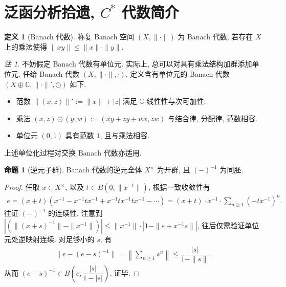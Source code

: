 \documentclass{MainStyle}
\theoremstyle{definition}
\theoremstyle{definition}
\theoremstyle{definition}
\newtheorem{definition}{定义}
\theoremstyle{definition}
\newtheorem{proposition}{命题}
\theoremstyle{definition}
\theoremstyle{definition}
\theoremstyle{definition}
\theoremstyle{remark}
\newtheorem{remark}{注}
\theoremstyle{remark}
\begin{document}
\maketitle
\section{泛函分析拾遗, \texorpdfstring{$C^\ast$}{} 代数简介}

\begin{definition}[Banach 代数]
    称复 Banach 空间 $(X,\|\cdot\|)$ 为 Banach 代数, 若存在 $X$ 上的乘法使得 $\|xy\|\leq \|x\|\cdot \|y\|$.
\end{definition}

\begin{remark}
    不妨假定 Banach 代数有单位元. 实际上, 总可以对具有乘法结构加群添加单位元. 任给 Banach 代数 $(X,\|\cdot\|,\cdot)$, 定义含有单位元的 Banach 代数 $(X\oplus \mathbb C, \| \cdot \|',\odot)$ 如下.
    \begin{itemize}
        \item 范数 $\|(x,z)\|':=\|x\|+|z|$ 满足 $\mathbb C$-线性性与次可加性.
        \item 乘法 $(x,z)\odot(y,w):=(xy+zy+wx,zw)$ 与结合律, 分配律, 范数相容.
        \item 单位元 $(0,1)$ 具有范数 $1$, 且与乘法相容.
    \end{itemize}
    上述单位化过程对交换 Banach 代数亦适用.
\end{remark}

\begin{proposition}[逆元子群]
    Banach 代数的逆元全体 $X^\times$ 为开群, 且 $(-)^{-1}$ 为同胚.
    \begin{proof}
        任取 $x\in X^\times$, 以及 $t\in B(0,\|x^{-1}\|)$, 根据一致收敛性有
        \begin{align*}
            e=(x+t)(x^{-1}-x^{-1}tx^{-1}+x^{-1}tx^{-1}tx^{-1}-\cdots)=(x+t)\cdot x^{-1}\cdot \sum_{n\geq 1}(-tx^{-1})^n.
        \end{align*}
        往证 $(-)^{-1}$ 的连续性. 注意到 $\left|(\|(x+s)^{-1}\|-\|x^{-1}\|)\right|\leq\|x^{-1}\|\cdot |1-\|e+x^{-1}s\||$, 往后仅需验证单位元处逆映射连续. 对足够小的 $s$, 有
        \begin{align*}
            \|e-(e-s)^{-1}\|=\left\|\sum_{n\geq 1} s^n\right\|\leq \dfrac{|s|}{1-\|s\|}.
        \end{align*}
        从而 $(e-s)^{-1}\in B\left(e,\dfrac{|s|}{1-|s|}\right)$. 证毕.
    \end{proof}
\end{proposition}
\end{document}
